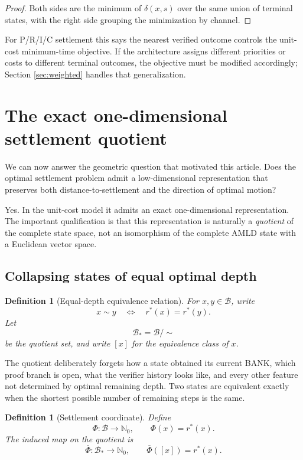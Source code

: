 \documentclass[11pt,letterpaper]{article}
\newtheorem{definition}[theorem]{Definition}
\theoremstyle{remark}
\newcommand{\Basin}{\mathcal B}
\newcommand{\N}{\mathbb N}
\newcommand{\rstar}{r^{\!*}}
\begin{document}
\begin{proof}
Both sides are the minimum of $\delta(x,s)$ over the same union of terminal states, with the right side grouping the minimization by channel.
\end{proof}

For P/R/I/C settlement this says the nearest verified outcome controls the unit-cost minimum-time objective. If the architecture assigns different priorities or costs to different terminal outcomes, the objective must be modified accordingly; Section \ref{sec:weighted} handles that generalization.

\section{The exact one-dimensional settlement quotient}\label{sec:quotient}

We can now answer the geometric question that motivated this article. Does the optimal settlement problem admit a low-dimensional representation that preserves both distance-to-settlement and the direction of optimal motion?

Yes. In the unit-cost model it admits an exact one-dimensional representation. The important qualification is that this representation is naturally a \emph{quotient} of the complete state space, not an isomorphism of the complete AMLD state with a Euclidean vector space.

\subsection{Collapsing states of equal optimal depth}

\begin{definition}[Equal-depth equivalence relation]
For $x,y\in\Basin$, write
\[
x\sim y\quad\Longleftrightarrow\quad \rstar(x)=\rstar(y).
\]
Let
\[
\Basin_{\!*}=\Basin/\!\sim
\]
be the quotient set, and write $[x]$ for the equivalence class of $x$.
\end{definition}

The quotient deliberately forgets how a state obtained its current BANK, which proof branch is open, what the verifier history looks like, and every other feature not determined by optimal remaining depth. Two states are equivalent exactly when the shortest possible number of remaining steps is the same.

\begin{definition}[Settlement coordinate]
Define
\[
\Phi:\Basin\to\N_0,\qquad \Phi(x)=\rstar(x).
\]
The induced map on the quotient is
\[
\overline\Phi:\Basin_{\!*}\to\N_0,\qquad \overline\Phi([x])=\rstar(x).
\]
\end{definition}
\end{document}
